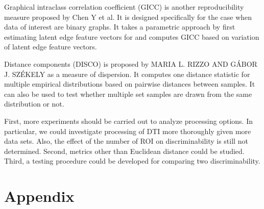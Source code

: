 \documentclass{article}
\begin{document}
Graphical intraclass correlation coefficient (GICC) is another reproducibility measure proposed by Chen Y et al. It is designed specifically for the case when data of interest are binary graphs. It takes a parametric approach by first estimating latent edge feature vectors for and computes GICC based on variation of latent edge feature vectors.

Distance components (DISCO) is proposed by MARIA L. RIZZO AND GÁBOR J. SZÉKELY as a measure of dispersion. It computes one distance statistic for multiple empirical distributions based on pairwise distances between samples. It can also be used to test whether multiple set samples are drawn from the same distribution or not. 


 First, more experiments should be carried out to analyze processing options. In particular, we could investigate processing of DTI more thoroughly given more data sets. Also, the effect of the number of ROI on discriminability is still not determined. Second, metrics other than Euclidean distance could be studied. Third, a testing procedure could be developed for comparing two discriminability.



\section{Appendix}


% 
% 
% 
% 
% 
% 
% 
% 



\appendix






\newpage
\small{


}
\end{document}
